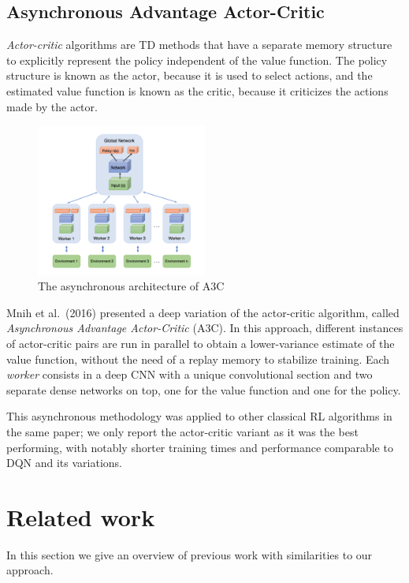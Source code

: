 \subsection{Asynchronous Advantage Actor-Critic}
\textit{Actor-critic} algorithms \cite{sutton1998reinforcement} are TD methods 
that have a separate memory structure to explicitly represent the policy 
independent of the value function. The policy structure is known as the actor, 
because it is used to select actions, and the estimated value function is known 
as the critic, because it criticizes the actions made by the actor.
%
\begin{figure}[h]
\includegraphics[width=0.5\textwidth]{pictures/a3c}
\centering
\caption{The asynchronous architecture of A3C}
\end{figure}
%
Mnih et al.\ (2016) \cite{mnih2016asynchronous} presented a deep variation of 
the actor-critic algorithm, called \textit{Asynchronous Advantage Actor-Critic} 
(A3C). In this approach, different instances of actor-critic pairs are run in 
parallel to obtain a lower-variance estimate of the value function, without the 
need of a replay memory to stabilize training. Each \textit{worker} consists in 
a deep CNN with a unique convolutional section and two separate dense networks
on top, one for the value function and one for the policy. 

This asynchronous methodology was applied to other classical RL algorithms in 
the same paper; we only report the actor-critic variant as it was the best 
performing, with notably shorter training times and performance comparable 
to DQN and its variations.

\section{Related work}
In this section we give an overview of previous work with similarities to our
approach.

